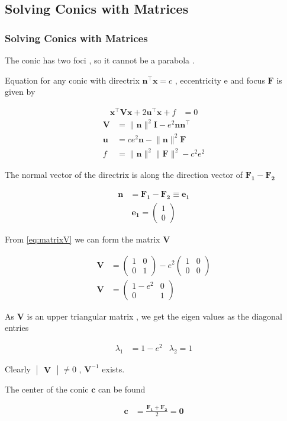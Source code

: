 \documentclass{beamer}
\theoremstyle{remark}
\providecommand{\norm}[1]{\lVert#1\rVert}
\newcommand{\myvec}[1]{\ensuremath{\begin{pmatrix}#1\end{pmatrix}}}
\newcommand{\mydet}[1]{\ensuremath{\begin{vmatrix}#1\end{vmatrix}}}
\let\vec\mathbf
\numberwithin{equation}{section}
\begin{document}
\subsection{Solving Conics with Matrices}
\begin{frame}
\frametitle{Solving Conics with Matrices}

The conic has two foci , so it cannot be a parabola .

Equation for any conic with directrix $\vec{n}^\top\vec{x} = c$ , eccentricity e and focus $\vec{F}$ is given by 

\begin{align}
  \vec{x}^\top\vec{V}\vec{x} + 2\vec{u}^\top\vec{x} + f &= 0 \label{eq:conic} 
\end{align}
\begin{align}
  \vec{V} &= \norm{\vec{n}}^2\vec{I} - e^2\vec{n}\vec{n}^\top \label{eq:matrixV} \\
  \vec{u} &= ce^2\vec{n} - \norm{\vec{n}}^2\vec{F} \label{eq:matrixu} \\
  f &= \norm{\vec{n}}^2\norm{\vec{F}}^2 - c^2e^2 \label{eq:f}
\end{align}

The normal vector of the directrix is along the direction vector of $\vec{F_1} - \vec{F_2}$

\begin{align}
  \vec{n} &= \vec{F_1} - \vec{F_2} \equiv \vec{e_1}
\end{align}
\begin{align}
\vec{e_1} = \myvec{1\\0}
\end{align}
\end{frame}
\begin{frame}
From \eqref{eq:matrixV} we can form the matrix $\vec{V}$

\begin{align}
  \vec{V} &= \myvec{1 & 0\\0 & 1} - e^2\myvec{1 & 0\\0 & 0}\\
  \vec{V} &= \myvec{1-e^2 & 0\\0 & 1}
\end{align}

As $\vec{V}$ is an upper triangular matrix , we get the eigen values as the diagonal entries 

\begin{align}
  \lambda_1 &= 1 - e^2 & \lambda_2 = 1
\end{align}

Clearly $\mydet{\vec{V}} \neq 0$ , $\vec{V}^{-1}$ exists.



The center of the conic $\vec{c}$ can be found 

\begin{align}
  \vec{c} &= \frac{\vec{F_1}+\vec{F_2}}{2} = \vec{0}
\end{align}
\end{frame}
\end{document}
